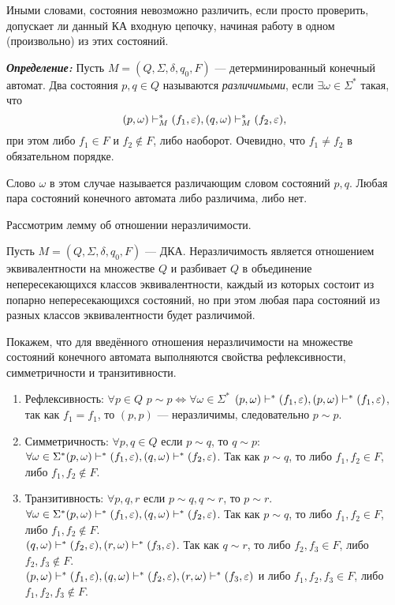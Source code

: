 Иными словами, состояния невозможно различить, если просто проверить, допускает ли данный КА входную цепочку, начиная работу в одном (произвольно) из этих состояний.

\textit{\textbf{Определение:}} Пусть $M = (Q,\Sigma, \delta, q_0, F)$ --- детерминированный конечный автомат. Два состояния $p, q \in Q$ называются \textit{различимыми}, если $\exists \omega \in \Sigma^*$ такая, что \[ (p, \omega) \vdash_M^* (f_1, \varepsilon), (q, \omega) \vdash_M^* (f_2, \varepsilon), \] при этом либо $f_1 \in F$ и $f_2 \notin F$, либо наоборот. Очевидно, что $f_1 \neq f_2$ в обязательном порядке.

Слово $\omega$ в этом случае называется различающим словом состояний $p, q$. Любая пара состояний конечного автомата либо различима, либо нет.

Рассмотрим лемму об отношении неразличимости.
\begin{mylemma}
Пусть $M = (Q,\Sigma, \delta, q_0, F)$ --- ДКА. Неразличимость является отношением эквивалентности на множестве $Q$ и разбивает $Q$ в объединение непересекающихся классов эквивалентности, каждый из которых состоит из попарно непересекающихся состояний, но при этом любая пара состояний из разных классов эквивалентности будет различимой.
\end{mylemma}
\begin{myproof}
Покажем, что для введённого отношения неразличимости на множестве состояний конечного автомата выполняются свойства рефлексивности, симметричности и транзитивности.
\begin{enumerate}
\item Рефлексивность: $\forall p \in Q$ $p \sim p \Leftrightarrow \forall \omega \in \Sigma^*$ $ (p, \omega) \vdash^* (f_1, \varepsilon), (p, \omega) \vdash^* (f_1, \varepsilon) $, так как $f_1 = f_1$, то $(p, p)$ --- неразличимы, следовательно $p \sim p$.
\item Симметричность: $\forall p, q \in Q$ если $p \sim q$, то $q \sim p$: \\
$\forall \omega \in \Sigma^* (p, \omega) \vdash^* (f_1, \varepsilon), (q, \omega) \vdash^* (f_2, \varepsilon) $. Так как $p \sim q$, то либо $f_1, f_2 \in F$, либо $f_1, f_2 \notin F$.
\item Транзитивность: $\forall p, q, r$ если $p \sim q, q \sim r$, то $p \sim r$.\\ $\forall \omega \in \Sigma^* (p, \omega) \vdash^* (f_1, \varepsilon), (q, \omega) \vdash^* (f_2, \varepsilon) $.
Так как $p \sim q$, то либо $f_1, f_2 \in F$, либо $f_1, f_2 \notin F$. \\
$ (q, \omega) \vdash^* (f_2, \varepsilon), (r, \omega) \vdash^* (f_3, \varepsilon) $.
Так как $q \sim r$, то либо $f_2, f_3 \in F$, либо $f_2, f_3 \notin F$. \\
$ (p, \omega) \vdash^* (f_1, \varepsilon), (q, \omega) \vdash^* (f_2, \varepsilon), (r, \omega) \vdash^* (f_3, \varepsilon) $
и либо $f_1, f_2, f_3 \in F$, либо $f_1, f_2, f_3 \notin F$.
\end{enumerate}
\end{myproof}

